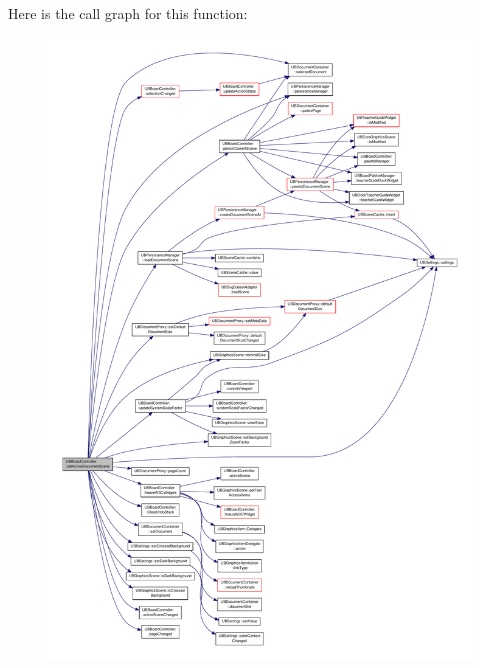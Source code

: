 Here is the call graph for this function\-:
\nopagebreak
\begin{figure}[H]
\begin{center}
\leavevmode
\includegraphics[width=350pt]{d7/d62/class_u_b_board_controller_a6a1f06f9fecbba81ab58d813faae3fb0_cgraph}
\end{center}
\end{figure}




